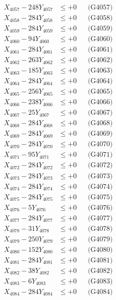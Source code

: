 \documentclass[a4paper,10pt]{article}
\begin{document}
{\begin{align}
X_{4057} - 248Y_{4057} &\leq +0 && \text{(G4057)} \\
X_{4058} - 284Y_{4058} &\leq +0 && \text{(G4058)} \\
X_{4059} - 284Y_{4059} &\leq +0 && \text{(G4059)} \\
X_{4060} - 94Y_{4060} &\leq +0 && \text{(G4060)} \\
\allowbreak
X_{4061} - 284Y_{4061} &\leq +0 && \text{(G4061)} \\
X_{4062} - 263Y_{4062} &\leq +0 && \text{(G4062)} \\
X_{4063} - 185Y_{4063} &\leq +0 && \text{(G4063)} \\
X_{4064} - 284Y_{4064} &\leq +0 && \text{(G4064)} \\
X_{4065} - 256Y_{4065} &\leq +0 && \text{(G4065)} \\
X_{4066} - 238Y_{4066} &\leq +0 && \text{(G4066)} \\
X_{4067} - 25Y_{4067} &\leq +0 && \text{(G4067)} \\
X_{4068} - 284Y_{4068} &\leq +0 && \text{(G4068)} \\
X_{4069} - 284Y_{4069} &\leq +0 && \text{(G4069)} \\
X_{4070} - 284Y_{4070} &\leq +0 && \text{(G4070)} \\
\allowbreak
X_{4071} - 95Y_{4071} &\leq +0 && \text{(G4071)} \\
X_{4072} - 284Y_{4072} &\leq +0 && \text{(G4072)} \\
X_{4073} - 284Y_{4073} &\leq +0 && \text{(G4073)} \\
X_{4074} - 284Y_{4074} &\leq +0 && \text{(G4074)} \\
X_{4075} - 284Y_{4075} &\leq +0 && \text{(G4075)} \\
X_{4076} - 5Y_{4076} &\leq +0 && \text{(G4076)} \\
X_{4077} - 284Y_{4077} &\leq +0 && \text{(G4077)} \\
X_{4078} - 31Y_{4078} &\leq +0 && \text{(G4078)} \\
X_{4079} - 250Y_{4079} &\leq +0 && \text{(G4079)} \\
X_{4080} - 152Y_{4080} &\leq +0 && \text{(G4080)} \\
\allowbreak
X_{4081} - 284Y_{4081} &\leq +0 && \text{(G4081)} \\
X_{4082} - 38Y_{4082} &\leq +0 && \text{(G4082)} \\
X_{4083} - 6Y_{4083} &\leq +0 && \text{(G4083)} \\
X_{4084} - 284Y_{4084} &\leq +0 && \text{(G4084)} \\

\end{align}}
\end{document}
